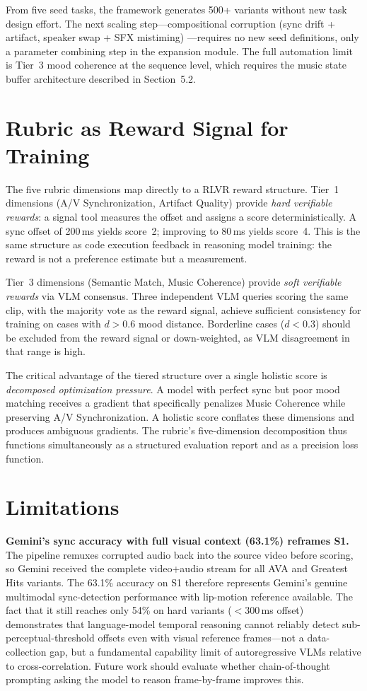 \documentclass[11pt]{article}
\begin{document}
From five seed tasks, the framework generates 500+ variants without new task design effort. The
next scaling step---compositional corruption (sync drift + artifact, speaker swap + SFX mistiming)
---requires no new seed definitions, only a parameter combining step in the expansion module.
The full automation limit is Tier~3 mood coherence at the sequence level, which requires the
music state buffer architecture described in Section~5.2.

\section{Rubric as Reward Signal for Training}

The five rubric dimensions map directly to a RLVR reward structure. Tier~1 dimensions (A/V
Synchronization, Artifact Quality) provide \emph{hard verifiable rewards}: a signal tool
measures the offset and assigns a score deterministically. A sync offset of 200\,ms yields
score~2; improving to 80\,ms yields score~4. This is the same structure as code execution
feedback in reasoning model training: the reward is not a preference estimate but a
measurement.

Tier~3 dimensions (Semantic Match, Music Coherence) provide \emph{soft verifiable rewards}
via VLM consensus. Three independent VLM queries scoring the same clip, with the majority
vote as the reward signal, achieve sufficient consistency for training on cases with $d > 0.6$
mood distance. Borderline cases ($d < 0.3$) should be excluded from the reward signal or
down-weighted, as VLM disagreement in that range is high.

The critical advantage of the tiered structure over a single holistic score is
\emph{decomposed optimization pressure}. A model with perfect sync but poor mood matching
receives a gradient that specifically penalizes Music Coherence while preserving A/V
Synchronization. A holistic score conflates these dimensions and produces ambiguous
gradients. The rubric's five-dimension decomposition thus functions simultaneously as a
structured evaluation report and as a precision loss function.

\section{Limitations}

\textbf{Gemini's sync accuracy with full visual context (63.1\%) reframes S1.}
The pipeline remuxes corrupted audio back into the source video before scoring, so
Gemini received the complete video+audio stream for all AVA and Greatest Hits variants.
The 63.1\% accuracy on S1 therefore represents Gemini's genuine multimodal sync-detection
performance with lip-motion reference available. The fact that it still reaches only
54\% on hard variants ($<$300\,ms offset) demonstrates that language-model temporal
reasoning cannot reliably detect sub-perceptual-threshold offsets even with visual
reference frames---not a data-collection gap, but a fundamental capability limit of
autoregressive VLMs relative to cross-correlation. Future work should evaluate whether
chain-of-thought prompting asking the model to reason frame-by-frame improves this.
\end{document}

